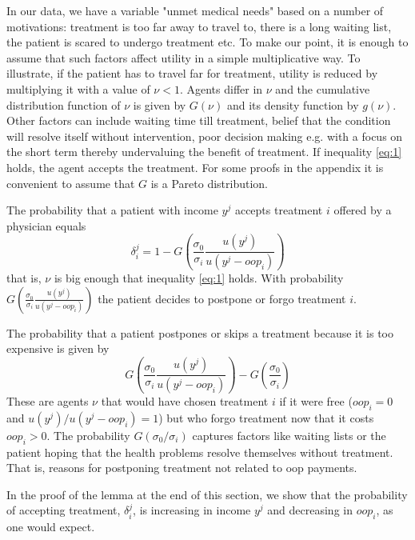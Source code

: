 \documentclass[a4paper,12pt]{article}
\begin{document}
In our data, we have a variable "unmet medical needs" based on a number of motivations: treatment is too far away to travel to, there is a long waiting list, the patient is scared to undergo treatment etc. To make our point, it is enough to assume that such factors affect utility in a simple multiplicative way. To illustrate, if the patient has to travel far for treatment, utility is reduced by multiplying it with a value of \(\nu < 1\). Agents differ in \(\nu\) and the cumulative distribution function of \(\nu\) is given by \(G(\nu)\) and its density function by \(g(\nu)\). Other factors can include waiting time till treatment, belief that the condition will resolve itself without intervention, poor decision making e.g. with a focus on the short term thereby undervaluing the benefit of treatment. If inequality \eqref{eq:1} holds, the agent accepts the treatment. For some proofs in the appendix it is convenient to assume that \(G\) is a Pareto distribution.

The probability that a patient with income \(y^{j}\) accepts treatment \(i\) offered by a physician equals
\begin{equation}
\label{eq:2}
\delta_i^j = 1-G\left( \frac{\sigma_0}{\sigma_i} \frac{u(y^{j})}{u(y^{j}-oop_i)} \right)
\end{equation}
that is, \(\nu\) is big enough that inequality \eqref{eq:1} holds. With probability \(G\left( \frac{\sigma_0}{\sigma_i} \frac{u(y^{j})}{u(y^{j}-oop_i)} \right)\) the patient decides to postpone or forgo treatment \(i\).

The probability that a patient postpones or skips a treatment because it is too expensive is given by
\begin{equation}
\label{eq:3}
G\left( \frac{\sigma_0}{\sigma_i} \frac{u(y^{j})}{u(y^{j}-oop_{i})} \right) - G\left( \frac{\sigma_0}{\sigma_i} \right)
\end{equation}
These are agents \(\nu\) that would have chosen treatment \(i\) if it were free (\(oop_{i}=0\) and \(u(y^j)/u(y^j-oop_i)=1\)) but who forgo treatment now that it costs \(oop_{i}>0\). The probability \(G(\sigma_{0}/\sigma_{i})\) captures factors like waiting lists or the patient hoping that the health problems resolve themselves without treatment. That is, reasons for postponing treatment not related to oop payments.

In the proof of the lemma at the end of this section, we show that the probability of accepting treatment, \(\delta_i^j\), is increasing in income \(y^j\) and decreasing in \(oop_{i}\), as one would expect.
\end{document}
